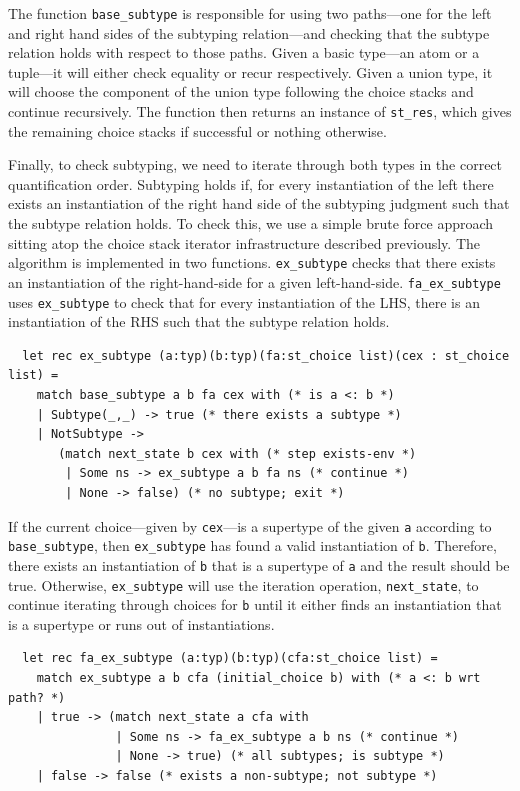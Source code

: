 \documentclass[a4paper,english]{lipics-v2019}
\begin{document}
The function \verb|base_subtype| is responsible for using two
paths---one for the left and right hand sides of the subtyping
relation---and checking that the subtype relation holds with respect
to those paths. Given a basic type---an atom or a tuple---it will
either check equality or recur respectively. Given a union type, it
will choose the component of the union type following the choice
stacks and continue recursively. The function then returns an instance
of \verb|st_res|, which gives the remaining choice stacks if
successful or nothing otherwise.

\par
Finally, to check subtyping, we need to iterate through both types in the 
correct quantification order. Subtyping holds if, for every instantiation 
of the left there exists an instantiation of the right hand side of the
subtyping judgment such that the subtype relation holds. To check this,
we use a simple brute force approach sitting atop the choice stack iterator
infrastructure described previously. The algorithm is implemented in two
functions. \verb|ex_subtype| checks that there exists an instantiation
of the right-hand-side for a given left-hand-side. \verb|fa_ex_subtype|
uses \verb|ex_subtype| to check that for every instantiation of the LHS,
there is an instantiation of the RHS such that the subtype relation
holds. 
\par
\begin{small}
\begin{verbatim}
  let rec ex_subtype (a:typ)(b:typ)(fa:st_choice list)(cex : st_choice list) =
    match base_subtype a b fa cex with (* is a <: b *)
    | Subtype(_,_) -> true (* there exists a subtype *)
    | NotSubtype -> 
       (match next_state b cex with (* step exists-env *)
        | Some ns -> ex_subtype a b fa ns (* continue *)
        | None -> false) (* no subtype; exit *)
\end{verbatim}
\end{small}
If the current choice---given by \verb|cex|---is a supertype of the given \verb|a| according
to \verb|base_subtype|, then \verb|ex_subtype| has found a valid instantiation of \verb|b|. Therefore,
there exists an instantiation of \verb|b| that is a supertype of \verb|a| and the result should be true.
Otherwise, \verb|ex_subtype| will use the iteration operation, \verb|next_state|, to continue iterating
through choices for \verb|b| until it either finds an instantiation that is a supertype or runs out
of instantiations.

\begin{small}
  \begin{verbatim}
  let rec fa_ex_subtype (a:typ)(b:typ)(cfa:st_choice list) =
    match ex_subtype a b cfa (initial_choice b) with (* a <: b wrt path? *)
    | true -> (match next_state a cfa with
               | Some ns -> fa_ex_subtype a b ns (* continue *)
               | None -> true) (* all subtypes; is subtype *)
    | false -> false (* exists a non-subtype; not subtype *)
\end{verbatim}
\end{small}
\end{document}
